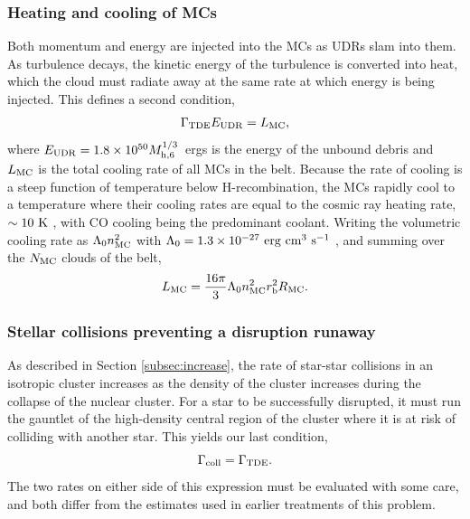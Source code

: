 \documentclass[preprint2]{aastex}
\newcommand{\mhsix}{M_{\rm h,6}\xspace}
\begin{document}
\subsubsection{Heating and cooling of MCs}

Both momentum and energy are injected into the MCs as UDRs slam into them. As turbulence decays, the kinetic energy of the turbulence is converted into heat, which the cloud must radiate away at the same rate at which energy is being injected. This defines a second condition,
\begin{equation}
\Gamma_{\rm TDE} E_{\rm UDR} = L_{\rm MC},\label{eq:cond2}
\end{equation}
where $E_{\rm UDR} = 1.8 \times 10^{50} \mhsix^{1/3}$~ergs is the energy of the unbound debris \citep{Guillochon:2016b} and $L_{\rm MC}$ is the total cooling rate of all MCs in the belt. Because the rate of cooling is a steep function of temperature below H-recombination, the MCs rapidly cool to a temperature where their cooling rates are equal to the cosmic ray heating rate, $\sim 10~{\rm K}$ \citep{Krumholz:2015a}, with CO cooling being the predominant coolant. Writing the volumetric cooling rate as $\Lambda_{0} n_{\rm MC}^{2}$ with $\Lambda_{0} = 1.3 \times 10^{-27}~{\rm erg~cm}^{3}~{\rm s}^{-1}$ \citep{Goldsmith:1978a,Neufeld:1995a}, and summing over the $N_{\rm MC}$ clouds of the belt,
\begin{equation}
L_{\rm MC} = \frac{16 \pi}{3} \Lambda_{0} n_{\rm MC}^{2} r_{\rm b}^{2} R_{\rm MC}.\label{eq:lmc}
\end{equation}

\subsubsection{Stellar collisions preventing a disruption runaway}\label{sec:collcond}

As described in Section \ref{subsec:increase}, the rate of star-star collisions in an isotropic cluster increases as the density of the cluster increases during the collapse of the nuclear cluster. For a star to be successfully disrupted, it must run the gauntlet of the high-density central region of the cluster where it is at risk of colliding with another star. This yields our last condition,
\begin{equation}
\Gamma_{\rm coll} = \Gamma_{\rm TDE}.\label{eq:cond3}
\end{equation}
The two rates on either side of this expression must be evaluated with some care, and both differ from the estimates used in earlier treatments of this problem.
\end{document}
